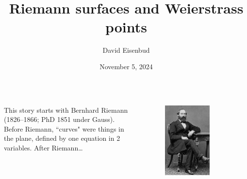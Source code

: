 \documentclass[11pt, aspectratio=43]{beamer}
\title{Riemann surfaces and Weierstrass points}
\author{David Eisenbud}
\date{November 5, 2024}
\begin{document}
\maketitle


\begin{frame}{}
\begin{columns}
 This story starts with \alert{Bernhard Riemann} (1826--1866; PhD 1851 under Gauss).
Before Riemann, ``curves" were things in the plane, defined by one equation in 2 variables. After Riemann\dots
{}
\begin{figure}
    \centering
    \includegraphics[width=0.7\textwidth]{"Bernhard-Riemann.jpg"}
\end{figure}
\end{columns}
 \end{frame}
\end{document}
